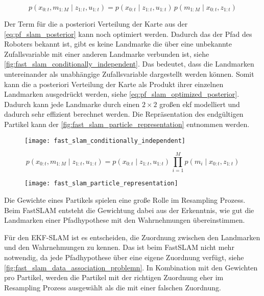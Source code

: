 \begin{equation}
p(x_{0:t}, m_{1:M} \mid z_{1:t}, u_{1:t}) = p(x_{0:t} \mid z_{1:t}, u_{1:t}) \, p(m_{1:M} \mid x_{0:t}, z_{1:t}) \label{eq:pf_slam_posterior}
\end{equation}

Der Term für die a posteriori Verteilung der Karte aus der \autoref{eq:pf_slam_posterior} kann noch optimiert werden. Dadurch das der Pfad des Roboters bekannt ist, gibt es keine Landmarke die über eine unbekannte Zufallsvariable mit einer anderen Landmarke verbunden ist, siehe \autoref{fig:fast_slam_conditionally_independent}. Das bedeutet, dass die Landmarken untereinander als unabhängige Zufallsvariable dargestellt werden können. Somit kann die a posteriori Verteilung der Karte als Produkt ihrer einzelnen Landmarken ausgedrückt werden, siehe \autoref{eq:pf_slam_optimized_posterior}. Dadurch kann jede Landmarke durch einen $2 \times 2$ großen \gls{ekf} modelliert und dadurch sehr effizient berechnet werden. Die Repräsentation des endgültigen Partikel kann der \autoref{fig:fast_slam_particle_representation} entnommen werden.

\begin{figure}
	\centering
	\texttt{[image: fast\_slam\_conditionally\_independent]}
	\label{fig:fast_slam_conditionally_independent}
\end{figure}

\begin{equation}
p(x_{0:t}, m_{1:M} \mid z_{1:t}, u_{1:t}) = p(x_{0:t} \mid z_{1:t}, u_{1:t}) \, \prod_{i=1}^{M} p(m_i \mid x_{0:t}, z_{1:t}) \label{eq:pf_slam_optimized_posterior}
\end{equation}

\begin{figure}
	\centering
	\texttt{[image: fast\_slam\_particle\_representation]}
	\label{fig:fast_slam_particle_representation}
\end{figure}

Die Gewichte eines Partikels spielen eine große Rolle im Resampling Prozess. Beim \mbox{FastSLAM} entsteht die Gewichtung dabei aus der Erkenntnis, wie gut die Landmarken einer Pfadhypothese mit den Wahrnehmungen übereinstimmen.

Für den EKF-SLAM ist es entscheiden, die Zuordnung zwischen den Landmarken und den Wahrnehmungen zu kennen. Das ist beim FastSLAM nicht mehr notwendig, da jede Pfadhypothese über eine eigene Zuordnung verfügt, siehe \autoref{fig:fast_slam_data_association_problemn}. In Kombination mit den Gewichten pro Partikel, werden die Partikel mit der richtigen Zuordnung eher im Resampling Prozess ausgewählt als die mit einer falschen Zuordnung.

